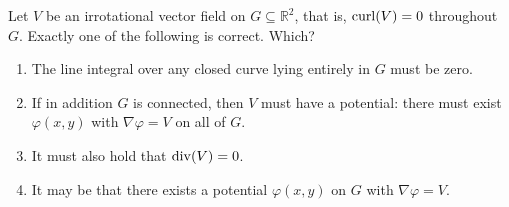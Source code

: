 \begin{exercise}
\label{ex:kobel_irrotational_single_choice}
Let $V$ be an irrotational vector field on $G \subseteq \mathbb{R}^2$, that is, $\operatorname{curl}(V) = 0$
throughout $G$. Exactly one of the following is correct. Which?
\begin{enumerate}[label=\textbf{(\alph*)}]
  \item The line integral over any closed curve lying entirely in $G$ must be zero.
  \item If in addition $G$ is connected, then $V$ must have a potential: there must exist
    $\varphi(x,y)$ with $\nabla\varphi = V$ on all of $G$.
  \item It must also hold that $\operatorname{div}(V) = 0$.
  \item It may be that there exists a potential $\varphi(x,y)$ on $G$ with $\nabla\varphi = V$.
\end{enumerate}
\end{exercise}
